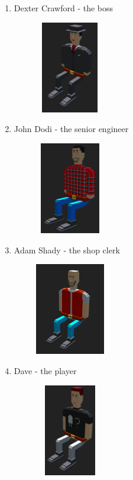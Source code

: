 \documentclass[12pt]{article}
\begin{document}
\begin{enumerate}
    \item Dexter Crawford - the boss
          \begin{center}
              \includegraphics[width=5cm, height=4cm]{boss.png}
          \end{center}
    \item John Dodi - the senior engineer
          \begin{center}
              \includegraphics[width=5cm, height=4cm]{john-dodi.png}
          \end{center}
          \pagebreak
    \item Adam Shady - the shop clerk
          \begin{center}
              \includegraphics[width=5cm, height=4cm]{clerk.png}
          \end{center}
    \item Dave - the player
          \begin{center}
              \includegraphics[width=5cm, height=4cm]{player.png}
          \end{center}
\end{enumerate}
\end{document}
